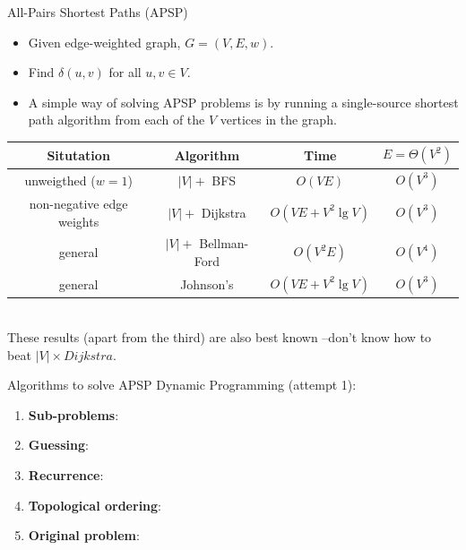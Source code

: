 \documentclass[aspectratio=169]{beamer}
\begin{document}
\begin{frame}{All-Pairs Shortest Paths (APSP)}
    \begin{itemize}
        \item Given edge-weighted graph, $G = (V, E, w)$.
        \item Find $\delta(u, v)$ for all $u, v \in V$.
        \item A simple way of solving APSP problems is by running a single-source shortest path algorithm from each of the $V$ vertices in the graph.
    \end{itemize}\pause
    \bigskip
    \tiny
    \centering
    \begin{tabular}{ c | c | c | c}
        \textbf{Situtation}         & \textbf{Algorithm}    & \textbf{Time}         & $E=\Theta(V^2)$ \\ \hline
        unweigthed ($w = 1$)        & $|V| + $ BFS          & $O(V E)$              & $O(V^3)$ \\
        non-negative edge weights   & $|V| + $ Dijkstra     & $O(V E + V^2 \lg V)$  & $O(V^3)$ \\
        general                     & $|V| + $ Bellman-Ford & $O(V^2 E)$            & $O(V^4)$ \\
        general                     & Johnson’s             & $O(V E + V^2 \lg V)$  & $O(V^3)$ \\
    \end{tabular}\\
    \bigskip
    \footnotesize
    These results (apart from the third) are also best known --don’t know how to beat $|V| \times Dijkstra$.
\end{frame}

\begin{frame}{Algorithms to solve APSP}
    Dynamic Programming (attempt 1):
    \begin{enumerate}
    \scriptsize
        \item \textbf{Sub-problems}:
        \item \textbf{Guessing}:
        \item \textbf{Recurrence}:
        \item \textbf{Topological ordering}:
        \item \textbf{Original problem}:
    \end{enumerate}
\end{frame}
\end{document}
